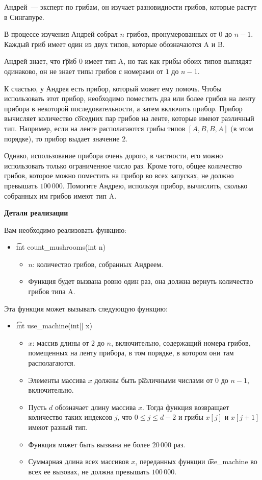 Андрей~--- эксперт по грибам, он изучает разновидности грибов, которые растут в Сингапуре.

В процессе изучения Андрей собрал $n$ грибов, пронумерованных от $0$ до $n-1$. Каждый гриб имеет один из двух типов, которые обозначаются A и B.

Андрей знает, что \t{гриб $0$ имеет тип A}, но так как грибы обоих типов выглядят одинаково, он не знает типы грибов с номерами от $1$ до $n-1$.

К счастью, у Андрея есть прибор, который может ему помочь. Чтобы использовать этот прибор, необходимо поместить два или более грибов на ленту прибора в некоторой последовательности, а затем включить прибор. Прибор вычисляет количество \t{соседних} пар грибов на ленте, которые имеют различный тип. Например, если на ленте располагаются грибы типов $[A, B, B, A]$ (в этом порядке), то прибор выдает значение $2$.

Однако, использование прибора очень дорого, в частности, его можно использовать только ограниченное число раз. Кроме того, общее количество грибов, которое можно поместить на прибор во всех запусках, не должно превышать $100\,000$. Помогите Андрею, используя прибор, вычислить, сколько собранных им грибов имеют тип A.

\textbf{Детали реализации}

Вам необходимо реализовать функцию:

\begin{itemize}
\item \t{int count\_mushrooms(int n)}
\begin{itemize}
\item $n$: количество грибов, собранных Андреем.
\item Функция будет вызвана ровно один раз, она должна вернуть количество грибов типа A.
\end{itemize}
\end{itemize}

Эта функция может вызывать следующую функцию:
\begin{itemize}
\item \t{int use\_machine(int[] x)}
\begin{itemize}
\item $x$: массив длины от $2$ до $n$, включительно, содержащий номера грибов, помещенных на ленту прибора, в том порядке, в котором они там располагаются.
\item Элементы массива $x$ должны быть \t{различными} числами от $0$ до $n-1$, включительно.
\item Пусть $d$ обозначает длину массива $x$. Тогда функция возвращает количество таких индексов $j$, что $0 \leq j \leq d-2$ и грибы $x[j]$ и $x[j+1]$ имеют разный тип.
\item Функция может быть вызвана не более $20\,000$ раз.
\item Суммарная длина всех массивов $x$, переданных функции \t{use\_machine} во всех ее вызовах, не должна превышать $100\,000$.
\end{itemize}
\end{itemize}

